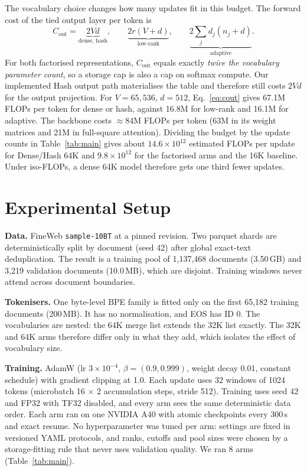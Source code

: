 \documentclass[10pt,a4paper]{article}
\begin{document}
The vocabulary choice changes how many updates fit in this budget. The forward cost of the tied
output layer per token is
\begin{equation}
C_{\text{out}} = \underbrace{2Vd}_{\text{dense, hash}},\qquad
\underbrace{2r(V+d)}_{\text{low-rank}},\qquad
\underbrace{2\textstyle\sum_j d_j(n_j+d)}_{\text{adaptive}} .
\label{eq:cout}
\end{equation}
For both factorised representations, $C_{\text{out}}$ equals exactly \emph{twice the vocabulary
parameter count}, so a storage cap is also a cap on softmax compute. Our implemented Hash output path
materialises the table and therefore still costs $2Vd$ for the output projection. For $V{=}65{,}536$, $d{=}512$,
Eq.~\eqref{eq:cout} gives 67.1M FLOPs per token for dense or hash, against 16.8M for low-rank and 16.1M for
adaptive. The backbone costs $\approx$84M FLOPs per token (63M in its weight matrices and 21M in
full-square attention). Dividing the budget by the update counts in
Table~\ref{tab:main} gives about $14.6\times10^{12}$ estimated FLOPs per update for Dense/Hash 64K and
$9.8\times10^{12}$ for the factorised arms and the 16K baseline. Under iso-FLOPs, a dense 64K model therefore gets one third fewer updates.

\section{Experimental Setup}
\label{sec:setup}

\textbf{Data.} FineWeb \citep{penedo2024fineweb} \texttt{sample-10BT} at a pinned revision. Two parquet
shards are deterministically split by document (seed 42) after global exact-text deduplication. The
result is a training pool of 1,137,468 documents (3.50\,GB) and 3,219 validation documents (10.0\,MB),
which are disjoint. Training windows never attend across document boundaries.

\textbf{Tokenisers.} One byte-level BPE family is fitted only on the first 65,182 training documents
(200\,MB). It has no normalisation, and EOS has ID 0. The vocabularies are nested: the 64K merge list
extends the 32K list exactly. The 32K and 64K arms therefore differ only in what they add, which isolates the
effect of vocabulary size.

\textbf{Training.} AdamW \citep{loshchilov2019adamw} (lr $3{\times}10^{-4}$, $\beta=(0.9,0.999)$, weight
decay 0.01, constant schedule) with gradient clipping at 1.0. Each update uses 32 windows of 1024 tokens
(microbatch 16 $\times$ 2 accumulation steps, stride 512). Training uses seed 42 and FP32 with TF32
disabled, and every arm sees the same deterministic data order. Each arm ran on one NVIDIA A40 with
atomic checkpoints every 300\,s and exact resume. No hyperparameter was tuned per arm: settings are fixed
in versioned YAML protocols, and ranks, cutoffs and pool sizes were chosen by a storage-fitting rule that
never uses validation quality. We ran 8 arms (Table~\ref{tab:main}).
\end{document}
